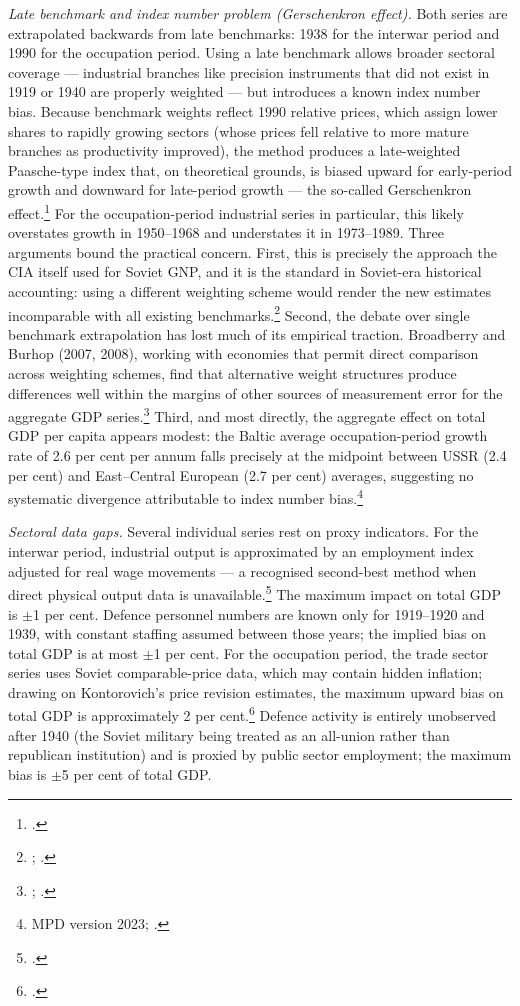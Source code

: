 \documentclass[12pt,a4paper]{article}
\begin{document}
\textit{Late benchmark and index number problem (Gerschenkron effect).} Both series are extrapolated backwards from late benchmarks: 1938 for the interwar period and 1990 for the occupation period. Using a late benchmark allows broader sectoral coverage — industrial branches like precision instruments that did not exist in 1919 or 1940 are properly weighted — but introduces a known index number bias. Because benchmark weights reflect 1990 relative prices, which assign lower shares to rapidly growing sectors (whose prices fell relative to more mature branches as productivity improved), the method produces a late-weighted Paasche-type index that, on theoretical grounds, is biased upward for early-period growth and downward for late-period growth — the so-called Gerschenkron effect.\footnote{\autocite[5--6]{gerschenkron1962}.} For the occupation-period industrial series in particular, this likely overstates growth in 1950--1968 and understates it in 1973--1989. Three arguments bound the practical concern. First, this is precisely the approach the CIA itself used for Soviet GNP, and it is the standard in Soviet-era historical accounting: using a different weighting scheme would render the new estimates incomparable with all existing benchmarks.\footnote{\autocite[48]{cia1982a}; \autocite[307--308]{Maddison1998b}.} Second, the debate over single benchmark extrapolation has lost much of its empirical traction. Broadberry and Burhop (2007, 2008), working with economies that permit direct comparison across weighting schemes, find that alternative weight structures produce differences well within the margins of other sources of measurement error for the aggregate GDP series.\footnote{\autocite{broad2007}; \autocite{broad2008}.} Third, and most directly, the aggregate effect on total GDP per capita appears modest: the Baltic average occupation-period growth rate of 2.6 per cent per annum falls precisely at the midpoint between USSR (2.4 per cent) and East--Central European (2.7 per cent) averages, suggesting no systematic divergence attributable to index number bias.\footnote{MPD version 2023; \autocite{mpd2023}.}

\textit{Sectoral data gaps.} Several individual series rest on proxy indicators. For the interwar period, industrial output is approximated by an employment index adjusted for real wage movements — a recognised second-best method when direct physical output data is unavailable.\footnote{\autocite[22]{broadberryinmorys}.} The maximum impact on total GDP is $\pm$1 per cent. Defence personnel numbers are known only for 1919--1920 and 1939, with constant staffing assumed between those years; the implied bias on total GDP is at most $\pm$1 per cent. For the occupation period, the trade sector series uses Soviet comparable-price data, which may contain hidden inflation; drawing on Kontorovich's price revision estimates, the maximum upward bias on total GDP is approximately 2 per cent.\footnote{\autocite[688--689]{kontorovich_2001}.} Defence activity is entirely unobserved after 1940 (the Soviet military being treated as an all-union rather than republican institution) and is proxied by public sector employment; the maximum bias is $\pm$5 per cent of total GDP.
\end{document}
